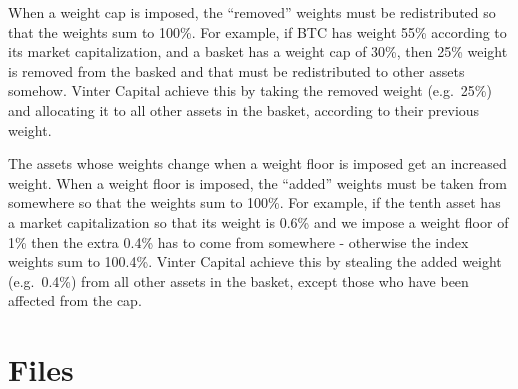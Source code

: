 \documentclass[12,]{article}
\begin{document}
When a weight cap is imposed, the ``removed'' weights must be
redistributed so that the weights sum to 100\%. For example, if BTC has
weight 55\% according to its market capitalization, and a basket has a
weight cap of 30\%, then 25\% weight is removed from the basked and that
must be redistributed to other assets somehow. Vinter Capital achieve
this by taking the removed weight (e.g.~25\%) and allocating it to all
other assets in the basket, according to their previous weight.

The assets whose weights change when a weight floor is imposed get an
increased weight. When a weight floor is imposed, the ``added'' weights
must be taken from somewhere so that the weights sum to 100\%. For
example, if the tenth asset has a market capitalization so that its
weight is 0.6\% and we impose a weight floor of 1\% then the extra 0.4\%
has to come from somewhere - otherwise the index weights sum to 100.4\%.
Vinter Capital achieve this by stealing the added weight (e.g.~0.4\%)
from all other assets in the basket, except those who have been affected
from the cap.

\section{Files}\label{files}
\end{document}
